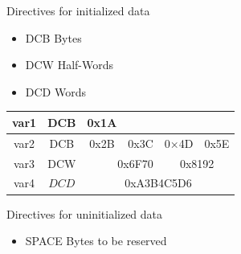 Directives for initialized data

\begin{itemize}
  \item DCB Bytes
  \item DCW Half-Words
  \item DCD Words
\end{itemize}

\begin{center}
\begin{tabular}{|c|c|c|c|c|c|}
\hline
var1 & DCB & 0x1A &  &  &  \\
\hline
var2 & DCB & 0x2B & 0x3C & 0×4D & 0x5E \\
\hline
var3 & DCW & \multicolumn{2}{|r|}{0x6F70} & \multicolumn{2}{|c|}{0x8192} \\
\hline
var4 & $D C D$ & \multicolumn{4}{|c|}{0xA3B4C5D6} \\
\hline
\end{tabular}
\end{center}

Directives for uninitialized data

\begin{itemize}
  \item SPACE Bytes to be reserved
\end{itemize}